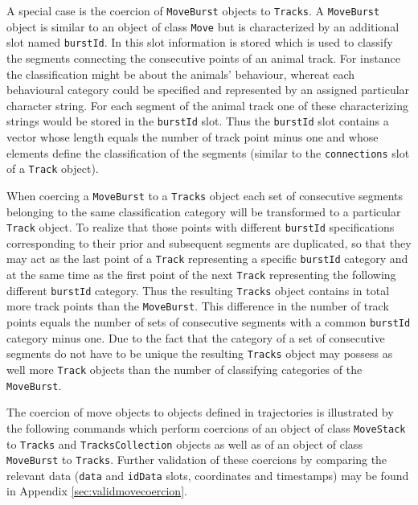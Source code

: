 \documentclass[12pt, oneside, a4paper]{scrbook}
\newcommand{\pkg}[1]{{\normalfont\fontseries{b}\selectfont #1}}
\let\code=\texttt
\begin{document}
A special case is the coercion of \code{MoveBurst} objects to \code{Tracks}.
A \code{MoveBurst} object is similar to an object of class \code{Move} but is characterized by an additional slot named \code{burstId}. In this slot information is stored which is used to classify the segments connecting the consecutive points of an animal track. 
For instance the classification might be about the animals' behaviour, whereat each behavioural category could be specified and represented by an assigned particular character string. For each segment of the animal track one of these characterizing strings would be stored in the \code{burstId} slot.
Thus the \code{burstId} slot contains a vector whose length equals the number of track point minus one and whose elements define the classification of the segments (similar to the \code{connections} slot of a \code{Track} object).
\par\medskip
When coercing a \code{MoveBurst} to a \code{Tracks} object each set of consecutive segments belonging to the same classification category will be transformed to a particular \code{Track} object. 
To realize that those points with different \code{burstId} specifications corresponding to their prior and subsequent segments are duplicated, so that they may act as the last point of a \code{Track} representing a specific \code{burstId} category and at the same time as the first point of the next \code{Track} representing the following different \code{burstId} category.
Thus the resulting \code{Tracks} object contains in total more track points than the \code{MoveBurst}. This difference in the number of track points equals the number of sets of consecutive segments with a common \code{burstId} category minus one.
Due to the fact that the category of a set of consecutive segments do not have to be unique the resulting \code{Tracks} object may possess as well more \code{Track} objects than the number of classifying categories of the \code{MoveBurst}.

\par\medskip

The coercion of \pkg{move} objects to objects defined in \pkg{trajectories} is illustrated by the following commands which perform coercions of an object of class \code{MoveStack} to \code{Tracks} and \code{TracksCollection} objects as well as of an object of class \code{MoveBurst} to \code{Tracks}. Further validation of these coercions by comparing the relevant data (\code{data} and \code{idData} slots, coordinates and timestamps) may be found in Appendix \ref{sec:validmovecoercion}.
\end{document}
